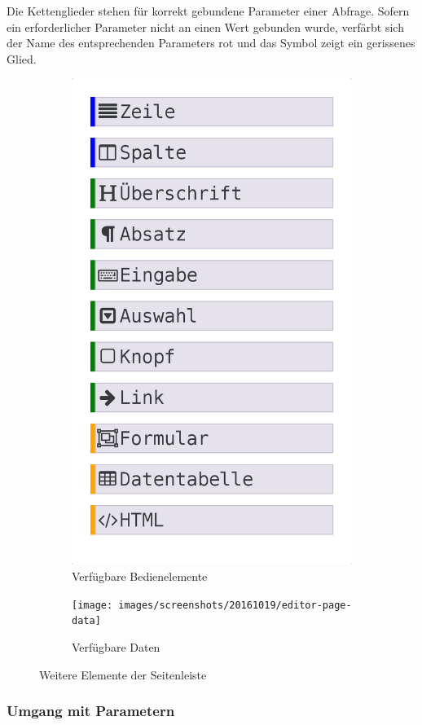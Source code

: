 Die Kettenglieder stehen für korrekt gebundene Parameter einer Abfrage. Sofern ein erforderlicher Parameter nicht an einen Wert gebunden wurde, verfärbt sich der Name des entsprechenden Parameters rot und das Symbol zeigt ein gerissenes Glied.

\begin{figure}[h]
  \begin{subfigure}[b]{0.45\textwidth}
    \includegraphics[width=\textwidth]{images/screenshots/20161019/editor-page-widgets}
    \caption{Verfügbare Bedienelemente}
    \label{fig:sidebar-editor-widgets}
  \end{subfigure}\hfill
  \begin{subfigure}[b]{0.45\textwidth}
    \texttt{[image: images/screenshots/20161019/editor-page-data]}
    \caption{Verfügbare Daten}
    \label{fig:sidebar-editor-data}    
  \end{subfigure}
  \caption{Weitere Elemente der Seitenleiste}
  \label{fig:sidebar-widgets}
\end{figure}

\subsubsection{Umgang mit Parametern}
\label{sec:ui-editor-params}

